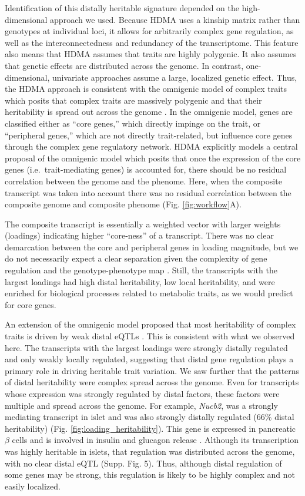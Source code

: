 \documentclass[
]{article}
\begin{document}
Identification of this distally heritable signature depended on the
high-dimensional approach we used. Because HDMA uses a kinship matrix
rather than genotypes at individual loci, it allows for arbitrarily
complex gene regulation, as well as the interconnectedness and
redundancy of the transcriptome. This feature also means that HDMA
assumes that traits are highly polygenic. It also assumes that genetic
effects are distributed across the genome. In contrast, one-dimensional,
univariate approaches assume a large, localized genetic effect. Thus,
the HDMA approach is consistent with the omnigenic model of complex
traits which posits that complex traits are massively polygenic and that
their heritability is spread out across the genome \cite{pmid28622505}.
In the omnigenic model, genes are classified either as ``core genes,''
which directly impinge on the trait, or ``peripheral genes,'' which are
not directly trait-related, but influence core genes through the complex
gene regulatory network. HDMA explicitly models a central proposal of
the omnigenic model which posits that once the expression of the core
genes (i.e.~trait-mediating genes) is accounted for, there should be no
residual correlation between the genome and the phenome. Here, when the
composite transcript was taken into account there was no residual
correlation between the composite genome and composite phenome (Fig.
\ref{fig:workflow}A).

The composite transcript is essentially a weighted vector with larger
weights (loadings) indicating higher ``core-ness'' of a transcript.
There was no clear demarcation between the core and peripheral genes in
loading magnitude, but we do not necessarily expect a clear separation
given the complexity of gene regulation and the genotype-phenotype map
\cite{pmid29906445}. Still, the transcripts with the largest loadings
had high distal heritability, low local heritability, and were enriched
for biological processes related to metabolic traits, as we would
predict for core genes.

An extension of the omnigenic model proposed that most heritability of
complex traits is driven by weak distal eQTLs \cite{pmid31051098}. This
is consistent with what we observed here. The transcripts with the
largest loadings were strongly distally regulated and only weakly
locally regulated, suggesting that distal gene regulation plays a
primary role in driving heritable trait variation. We saw further that
the patterns of distal heritability were complex spread across the
genome. Even for transcripts whose expression was strongly regulated by
distal factors, these factors were multiple and spread across the
genome. For example, \textit{Nucb2}, was a strongly mediating transcript
in islet and was also strongly distally regulated (66\% distal
heritability) (Fig. \ref{fig:loading_heritability}). This gene is
expressed in pancreatic \(\beta\) cells and is involved in insulin and
glucagon release \cite{pmid22108805, pmid23537085, pmid24993278}.
Although its transcription was highly heritable in islets, that
regulation was distributed across the genome, with no clear distal eQTL
(Supp. Fig. 5). Thus, although distal regulation of some genes may be
strong, this regulation is likely to be highly complex and not easily
localized.
\end{document}
